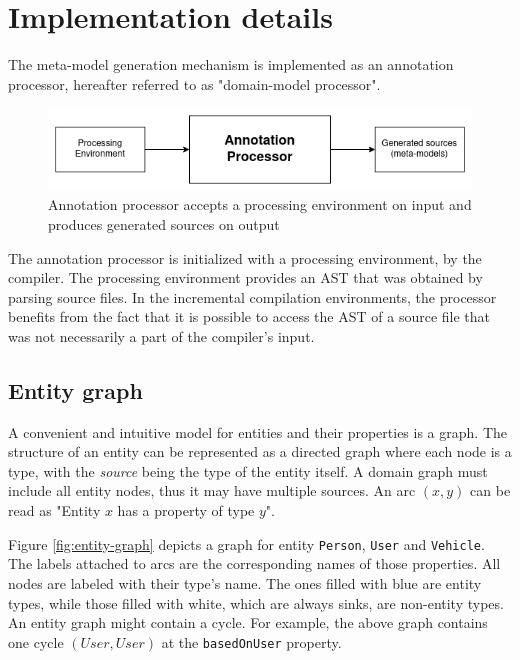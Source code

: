 \chapter{Implementation details}

The meta-model generation mechanism is implemented as an annotation processor, hereafter referred to as "domain-model processor".

\begin{figure}[H]\centering
    \includegraphics[scale=0.65]{images/implement1.drawio.png}
    \caption[Input and output of the annotation processor]{Annotation processor accepts a processing environment on input and produces generated sources on output}\label{fig:implement1}
\end{figure}

The annotation processor is initialized with a processing environment, by the compiler.
The processing environment provides an AST that was obtained by parsing source files.
In the incremental compilation environments, the processor benefits from the fact that it is possible to access the AST of a source file that was not necessarily a part of the compiler’s input.

\section{Entity graph}
A convenient and intuitive model for entities and their properties is a graph.
The structure of an entity can be represented as a directed graph where each node is a type, with the \textit{source} being the type of the entity itself.
A domain graph must include all entity nodes, thus it may have multiple sources.
An arc $(x, y)$ can be read as "Entity $x$ has a property of type $y$". 

\n

Figure \ref{fig:entity-graph} depicts a graph for entity \texttt{Person}, \texttt{User} and \texttt{Vehicle}.
The labels attached to arcs are the corresponding names of those properties.
All nodes are labeled with their type’s name.
The ones filled with blue are entity types, while those filled with white, which are always sinks, are non-entity types.
An entity graph might contain a cycle.
For example, the above graph contains one cycle $(User, User)$ at the \texttt{basedOnUser} property.

